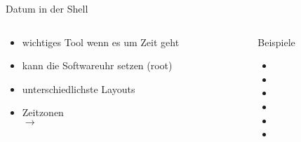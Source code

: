 \documentclass[aspectratio=43]{beamer}
\begin{document}
\begin{frame}{Datum in der Shell}
\begin{columns}
        \begin{column}{0.5\textwidth}
        \begin{block}{} 
        \begin{itemize}
        \item wichtiges Tool wenn es um Zeit geht
        \item kann die Softwareuhr setzen (root)
        \item unterschiedlichste Layouts
        \item Zeitzonen\\ $\rightarrow$ 
        \end{itemize}
        \end{block}
        \end{column} 
        
        \begin{column}{0.5\textwidth} 
        \begin{exampleblock}{Beispiele} 
        \begin{itemize}
        \item {}
        \item {}
        \item {}
        \item {}
        \item {}
        \item {}
        \end{itemize}
        \end{exampleblock}
        \end{column} 
\end{columns}
\end{frame}
\end{document}
